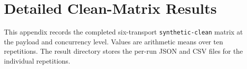 \section{Detailed Clean-Matrix Results}
\label{app:clean-matrix-details}

This appendix records the completed six-transport \texttt{synthetic-clean} matrix at the payload and concurrency level. Values are arithmetic means over ten repetitions. The result directory stores the per-run JSON and CSV files for the individual repetitions.

\begin{table}[!htbp]
    \centering
    \scriptsize
    \caption{Synthetic bulk-transfer throughput by message size, averaged over ten repetitions and concurrency levels 1, 4, 8, and 16.}
    \label{tab:grpc-per-size}
    \setlength{\tabcolsep}{3pt}
\end{table}

